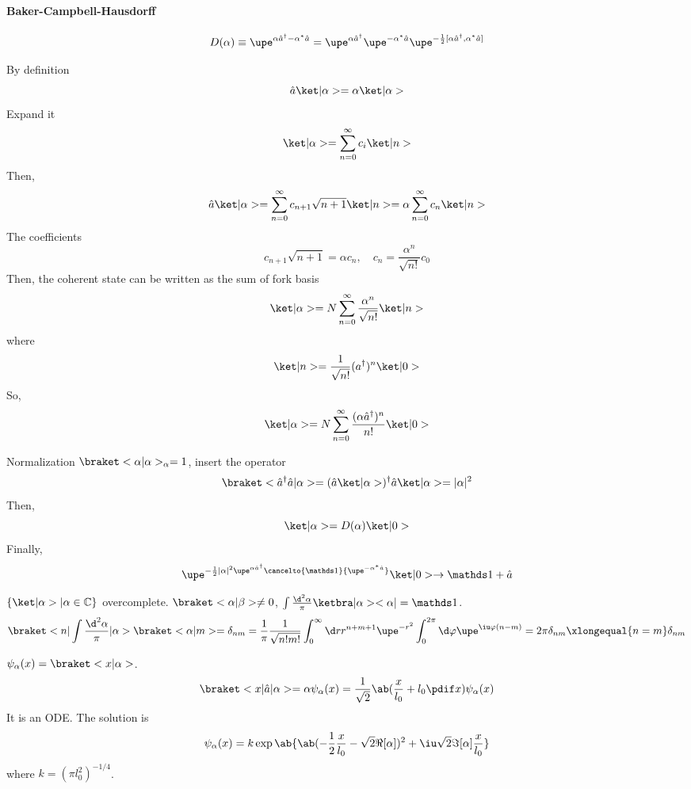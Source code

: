 \begin{solution}[By TA]\leavevmode
  \paragraph{Baker-Campbell-Hausdorff}
  \[
    D(\alpha) \equiv \upe^{\alpha\hat a^\dagger - \alpha^*\hat a}
  = \upe^{\alpha\hat a^\dagger} \upe^{-\alpha^*\hat a}
    \upe^{-\frac12[\alpha\hat a^\dagger, \alpha^*\hat a]}
  \]
  \begin{enumext}
    \item By definition
    \[
      \hat a\ket|\alpha> = \alpha\ket|\alpha>
    \]
    Expand it
    \[
      \ket|\alpha> = \sum_{n=0}^\infty c_i \ket|n>
    \]
    Then,
    \[
      \hat a\ket|\alpha> = \sum_{n=0}^\infty c_{n+1} \sqrt{n+1} \ket|n>
    = \alpha \sum_{n=0}^\infty c_n \ket|n>
    \]
    The coefficients
    \[
      c_{n+1}\sqrt{n + 1} = \alpha c_n, \quad
      c_n = \frac{\alpha^n}{\sqrt{n!}} c_0
    \]
    Then, the coherent state can be written as the sum of fork basis
    \[
      \ket|\alpha> = N \sum_{n=0}^\infty \frac{\alpha^n}{\sqrt{n!}} \ket|n>
    \]
    where
    \[
      \ket|n> = \frac1{\sqrt{n!}} (a^\dagger)^n \ket|0>
    \]
    So,
    \[
      \ket|\alpha> = N\sum_{n=0}^\infty
      \frac{(\alpha\hat a^\dagger)^n}{n!}\ket|0>
    \]
    \item Normalization $\braket<\alpha|\alpha>_\alpha = 1$, insert the operator
    \[
      \braket<\hat a^\dagger \hat a|\alpha>
    = (\hat a\ket|\alpha>)^\dagger\hat a\ket|\alpha> = |\alpha|^2
    \]
    Then,
    \[
      \ket|\alpha> = D(\alpha) \ket|0>
    \]
    Finally,
    \[
      \upe^{-\frac12|\alpha|^2\upe^{\alpha\hat a^\dagger}
      \cancelto{\identity}{\upe^{-\alpha^*\hat a}}}\ket|0> \to \identity
    + \hat a
    \]
    \item $\{\ket|\alpha> | \alpha \in \mathbb C\}$ overcomplete.
    $\braket<\alpha|\beta> \neq 0$,
    $\int \frac{\d^2\alpha}{\pi} \ketbra|\alpha><\alpha| = \identity$.
    \[
      \braket<n|\int\frac{\d^2\alpha}{\pi}|\alpha> \braket<\alpha|m>
    = \delta_{nm}
    = \frac1\pi \frac1{\sqrt{n!m!}} \int_0^\infty \d r r^{n+m+1}
      \upe^{-r^2} \int_0^{2\pi} \d\varphi \upe^{\iu\varphi(n-m)}
    = 2\pi\delta_{nm} \xlongequal{n=m} \delta_{nm}
    \]
    \item $\psi_\alpha(x) = \braket<x|\alpha>$.
    \[
      \braket<x|\hat a|\alpha> = \alpha \psi_\alpha(x)
    = \frac1{\sqrt2} \ab(\frac x{l_0} + l_0 \pdif x) \psi_\alpha(x)
    \]
    It is an ODE. The solution is
    \[
      \psi_\alpha(x) = k\exp\ab\{
        \ab(-\frac12\frac x{l_0} - \sqrt2\Re[\alpha])^2
       + \iu\sqrt2\Im[\alpha] \frac x{l_0}\}
    \]
    where $k = (\pi l_0^2)^{-1/4}$.


\end{enumext}
\end{solution}
